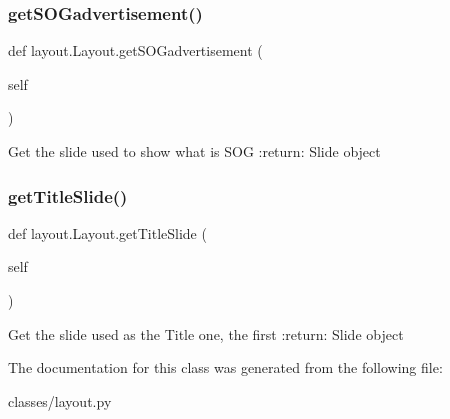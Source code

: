 \subsubsection{\texorpdfstring{get\+S\+O\+Gadvertisement()}{getSOGadvertisement()}}
{\footnotesize\ttfamily def layout.\+Layout.\+get\+S\+O\+Gadvertisement (\begin{DoxyParamCaption}\item[{}]{self }\end{DoxyParamCaption})}

\begin{DoxyVerb}Get the slide used to show what is SOG
:return: Slide object
\end{DoxyVerb}
 \mbox{\label{classlayout_1_1Layout_a863963cd203ccb0d31fef73dc598f138}} 
\subsubsection{\texorpdfstring{get\+Title\+Slide()}{getTitleSlide()}}
{\footnotesize\ttfamily def layout.\+Layout.\+get\+Title\+Slide (\begin{DoxyParamCaption}\item[{}]{self }\end{DoxyParamCaption})}

\begin{DoxyVerb}Get the slide used as the Title one, the first
:return: Slide object
\end{DoxyVerb}
 

The documentation for this class was generated from the following file\+:\begin{DoxyCompactItemize}
\item 
classes/layout.\+py\end{DoxyCompactItemize}
